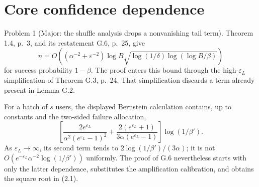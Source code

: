 \documentclass[10pt]{article}
\begin{document}
\section*{Core confidence dependence}
Problem 1 (Major: the shuffle analysis drops a nonvanishing tail term).  Theorem 1.4, p. 3, and its restatement G.6, p. 25, give \[n=O\!\left((\alpha^{-2}+\varepsilon^{-2})\log B
 \sqrt{\log(1/\delta)\log(\log B/\beta)}\right)\] for success probability \(1-\beta\). The proof enters this bound through the high-\(\varepsilon_L\) simplification of Theorem G.3, p. 24. That simplification discards a term already present in Lemma G.2.\par
For a batch of \(s\) users, the displayed Bernstein calculation contains, up to constants and the two-sided failure allocation, \[\left[
 \frac{2e^{\varepsilon_L}}{\alpha^2(e^{\varepsilon_L}-1)^2}
 +\frac{2(e^{\varepsilon_L}+1)}{3\alpha(e^{\varepsilon_L}-1)}
 \right]\log(1/\beta').\] As \(\varepsilon_L\to\infty\), its second term tends to \(2\log(1/\beta')/(3\alpha)\); it is not \(O(e^{-\varepsilon_L}\alpha^{-2}\log(1/\beta'))\) uniformly. The proof of G.6 nevertheless starts with only the latter dependence, substitutes the amplification calibration, and obtains the square root in (2.1).\par
\end{document}
